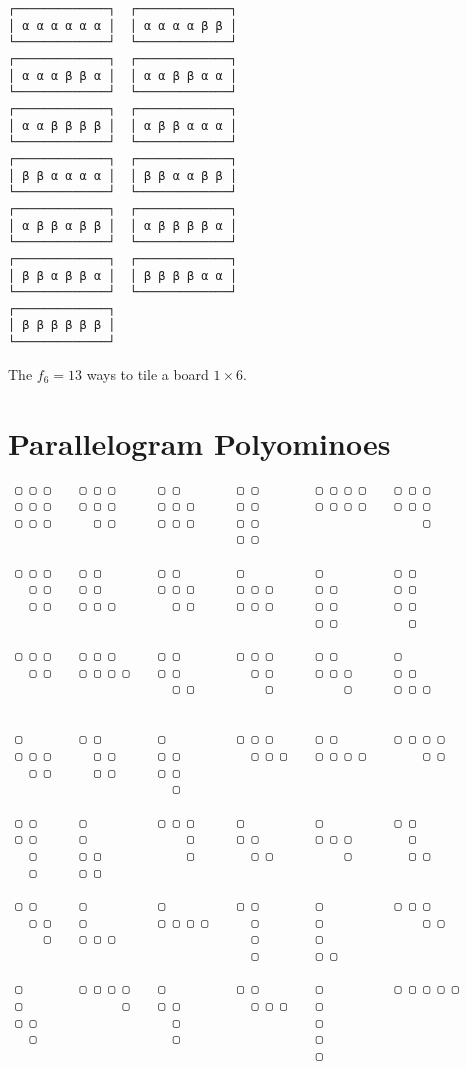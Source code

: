 \begin{margintable}%
{
\footnotesize
\begin{verbatim}
┌─────────────┐  ┌─────────────┐  
│ α α α α α α │  │ α α α α β β │  
└─────────────┘  └─────────────┘  
┌─────────────┐  ┌─────────────┐
│ α α α β β α │  │ α α β β α α │
└─────────────┘  └─────────────┘
┌─────────────┐  ┌─────────────┐  
│ α α β β β β │  │ α β β α α α │  
└─────────────┘  └─────────────┘  
┌─────────────┐  ┌─────────────┐  
│ β β α α α α │  │ β β α α β β │  
└─────────────┘  └─────────────┘  
┌─────────────┐  ┌─────────────┐
│ α β β α β β │  │ α β β β β α │
└─────────────┘  └─────────────┘
┌─────────────┐  ┌─────────────┐
│ β β α β β α │  │ β β β β α α │
└─────────────┘  └─────────────┘
┌─────────────┐
│ β β β β β β │
└─────────────┘
\end{verbatim}
}
\caption{ The $f_{6} = 13$ ways to tile a board $1\times 6$.}
\end{margintable}


\section{Parallelogram Polyominoes}

{
\small
\begin{Verbatim}
 ▢ ▢ ▢    ▢ ▢ ▢      ▢ ▢        ▢ ▢        ▢ ▢ ▢ ▢    ▢ ▢ ▢
 ▢ ▢ ▢    ▢ ▢ ▢      ▢ ▢ ▢      ▢ ▢        ▢ ▢ ▢ ▢    ▢ ▢ ▢
 ▢ ▢ ▢      ▢ ▢      ▢ ▢ ▢      ▢ ▢                       ▢
                                ▢ ▢

 ▢ ▢ ▢    ▢ ▢        ▢ ▢        ▢          ▢          ▢ ▢
   ▢ ▢    ▢ ▢        ▢ ▢ ▢      ▢ ▢ ▢      ▢ ▢        ▢ ▢
   ▢ ▢    ▢ ▢ ▢        ▢ ▢      ▢ ▢ ▢      ▢ ▢        ▢ ▢
                                           ▢ ▢          ▢

 ▢ ▢ ▢    ▢ ▢ ▢      ▢ ▢        ▢ ▢ ▢      ▢ ▢        ▢
   ▢ ▢    ▢ ▢ ▢ ▢    ▢ ▢          ▢ ▢      ▢ ▢ ▢      ▢ ▢
                       ▢ ▢          ▢          ▢      ▢ ▢ ▢


 ▢        ▢ ▢        ▢          ▢ ▢ ▢      ▢ ▢        ▢ ▢ ▢ ▢
 ▢ ▢ ▢      ▢ ▢      ▢ ▢          ▢ ▢ ▢    ▢ ▢ ▢ ▢        ▢ ▢
   ▢ ▢      ▢ ▢      ▢ ▢
                       ▢

 ▢ ▢      ▢          ▢ ▢ ▢      ▢          ▢          ▢ ▢
 ▢ ▢      ▢              ▢      ▢ ▢        ▢ ▢ ▢        ▢
   ▢      ▢ ▢            ▢        ▢ ▢          ▢        ▢ ▢
   ▢      ▢ ▢

 ▢ ▢      ▢          ▢          ▢ ▢        ▢          ▢ ▢ ▢
   ▢ ▢    ▢          ▢ ▢ ▢ ▢      ▢        ▢              ▢ ▢
     ▢    ▢ ▢ ▢                   ▢        ▢
                                  ▢        ▢ ▢

 ▢        ▢ ▢ ▢ ▢    ▢          ▢ ▢        ▢          ▢ ▢ ▢ ▢ ▢
 ▢              ▢    ▢ ▢          ▢ ▢ ▢    ▢
 ▢ ▢                   ▢                   ▢
   ▢                   ▢                   ▢
                                           ▢

\end{Verbatim}
}


